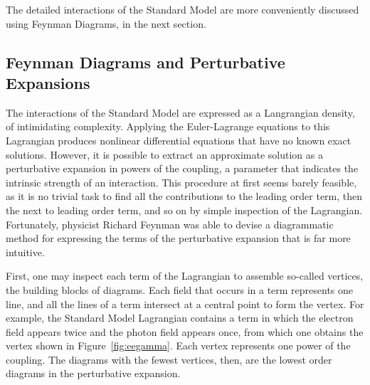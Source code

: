   The detailed interactions of the Standard Model are more conveniently discussed using Feynman Diagrams, in the next section.

  \subsection{Feynman Diagrams and Perturbative Expansions} \label{sec:feyndiags}

  The interactions of the Standard Model are expressed as a Langrangian density, of intimidating complexity.
  Applying the Euler-Lagrange equations to this Lagrangian produces nonlinear differential equations that have no known exact solutions.
  However, it is possible to extract an approximate solution as a perturbative expansion in powers of the coupling, a parameter that indicates the intrinsic strength of an interaction.
  This procedure at first seems barely feasible, as it is no trivial task to find all the contributions to the leading order term, then the next to leading order term, and so on by simple inspection of the Lagrangian.
  Fortunately, physicist Richard Feynman was able to devise a diagrammatic method for expressing the terms of the perturbative expansion that is far more intuitive.

  First, one may inspect each term of the Lagrangian to assemble so-called vertices, the building blocks of diagrams.
  Each field that occurs in a term represents one line, and all the lines of a term intersect at a central point to form the vertex.
  For example, the Standard Model Lagrangian contains a term in which the electron field appears twice and the photon field appears once, from which one obtains the vertex shown in Figure~\ref{fig:eegamma}.
  Each vertex represents one power of the coupling.
  The diagrams with the fewest vertices, then, are the lowest order diagrams in the perturbative expansion.

